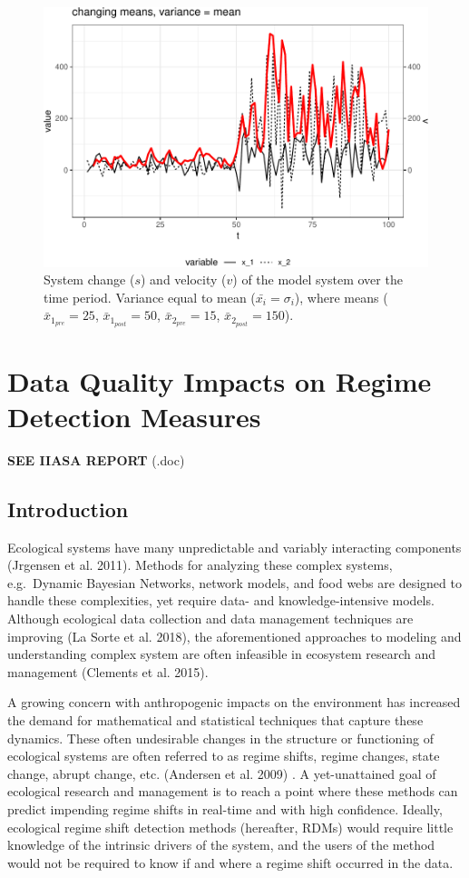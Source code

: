 \documentclass[12pt,twoside,openany]{reedthesis}
\begin{document}
\begin{figure}
\centering
\includegraphics{_myDissertation_files/figure-latex/velocSysEx4-1.pdf}
\caption{\label{fig:velocSysEx4}System change (\(s\)) and velocity (\(v\))
of the model system over the time period. Variance equal to mean
(\(\bar{x_i}=\sigma_i\)), where means (\(\bar{x}_{1_{pre}}=25\),
\(\bar{x}_{1_{post}}=50\), \(\bar{x}_{2_{pre}}=15\),
\(\bar{x}_{2_{post}}=150\)).}
\end{figure}
\chapter{Data Quality Impacts on Regime Detection
Measures}\label{resampling}

\textbf{SEE IIASA REPORT} (.doc)

\section{Introduction}\label{introduction-4}

Ecological systems have many unpredictable and variably interacting
components (Jrgensen et al. 2011). Methods for analyzing these complex
systems, e.g.~Dynamic Bayesian Networks, network models, and food webs
are designed to handle these complexities, yet require data- and
knowledge-intensive models. Although ecological data collection and data
management techniques are improving (La Sorte et al. 2018), the
aforementioned approaches to modeling and understanding complex system
are often infeasible in ecosystem research and management (Clements et
al. 2015).

A growing concern with anthropogenic impacts on the environment has
increased the demand for mathematical and statistical techniques that
capture these dynamics. These often undesirable changes in the structure
or functioning of ecological systems are often referred to as regime
shifts, regime changes, state change, abrupt change, etc. (Andersen et
al. 2009) . A yet-unattained goal of ecological research and management
is to reach a point where these methods can predict impending regime
shifts in real-time and with high confidence. Ideally, ecological regime
shift detection methods (hereafter, RDMs) would require little knowledge
of the intrinsic drivers of the system, and the users of the method
would not be required to know if and where a regime shift occurred in
the data.
\end{document}

